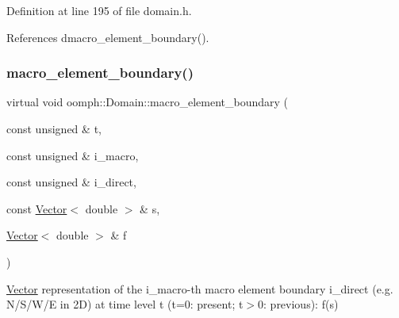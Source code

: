 Definition at line 195 of file domain.\+h.



References dmacro\+\_\+element\+\_\+boundary().

\mbox{\label{classoomph_1_1Domain_a95f3e00d28ea37e6c4d3027bfac91096}} 
\subsubsection{\texorpdfstring{macro\+\_\+element\+\_\+boundary()}{macro\_element\_boundary()}\hspace{0.1cm}{\footnotesize\ttfamily [1/2]}}
{\footnotesize\ttfamily virtual void oomph\+::\+Domain\+::macro\+\_\+element\+\_\+boundary (\begin{DoxyParamCaption}\item[{const unsigned \&}]{t,  }\item[{const unsigned \&}]{i\+\_\+macro,  }\item[{const unsigned \&}]{i\+\_\+direct,  }\item[{const \hyperlink{classoomph_1_1Vector}{Vector}$<$ double $>$ \&}]{s,  }\item[{\hyperlink{classoomph_1_1Vector}{Vector}$<$ double $>$ \&}]{f }\end{DoxyParamCaption})\hspace{0.3cm}{\ttfamily [pure virtual]}}



\hyperlink{classoomph_1_1Vector}{Vector} representation of the i\+\_\+macro-\/th macro element boundary i\+\_\+direct (e.\+g. N/\+S/\+W/E in 2D) at time level t (t=0\+: present; t$>$0\+: previous)\+: f(s) 



